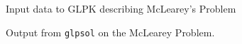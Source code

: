 \begin{example}
\begin{figure}[htbp]
\scriptsize

\caption{Input data to GLPK describing McLearey's Problem}
\label{fig:GLPKData}
\normalsize
\end{figure}

\begin{figure}[htbp]
\scriptsize

\caption{Output from \texttt{glpsol} on the McLearey Problem.}
\label{fig:GLPKOutput}
\normalsize
\end{figure}
\end{example}
